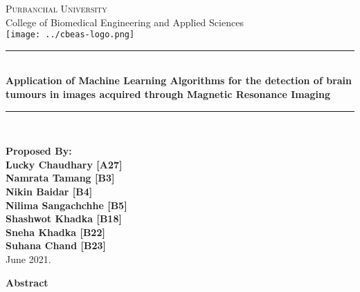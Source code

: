 \documentclass{article}
\newcommand{\HRule}{\rule{\linewidth}{0.1mm}}
\begin{document}
\begin{titlepage}
\begin{center}

  \textsc{\huge Purbanchal University}\\[1cm]
  {\huge College of Biomedical Engineering and Applied Sciences}\\[1cm]
  \texttt{[image: ../cbeas-logo.png]}\\[1cm]

  \color{red} \HRule \\[0.4cm] \color{black}
  {\huge \bfseries Application of Machine Learning Algorithms for the
  detection of brain tumours in images acquired through Magnetic
  Resonance Imaging}\\[0.2cm]
  \color{red} \HRule \\[2cm] \color{black}

\textbf{
\Large Proposed By:\\
\Large Lucky Chaudhary [A27]\\ Namrata Tamang [B3]\\ Nikin Baidar
  [B4]\\ Nilima Sangachchhe [B5]\\ Shashwot Khadka [B18]\\ Sneha
  Khadka [B22]\\Suhana Chand [B23]\\[1cm]}
\vfill
{\Large June 2021.}

\end{center}
\end{titlepage}


  \iffalse

    market ma mental disorder ko lagi widely accepted kunai pani
    imaging wa molecular basis chaina

    research haru bhako cha tara reverse fallacy le garda they are
    rather believed to be useless and inaccurate.

    tara advancements haru bhairacha and hamro reasearch le tyo
    advancement ma contribute garcha

  \fi

\begin{center}
  \textbf{\large Abstract}
\end{center}
\end{document}
